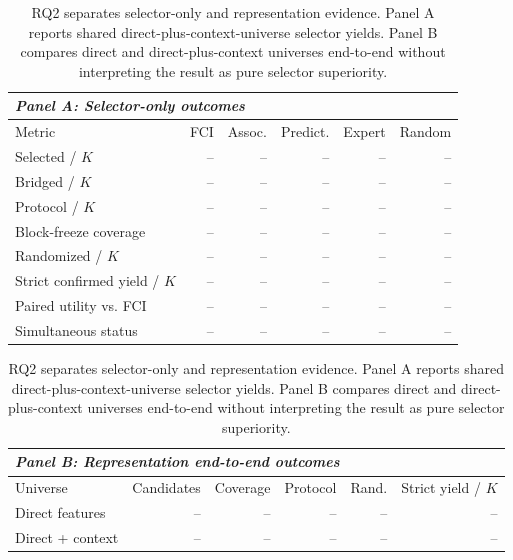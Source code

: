 \begin{table}[H]
  \centering
  \small
  \caption{RQ2 separates selector-only and representation evidence. Panel A
  reports shared direct-plus-context-universe selector yields. Panel B compares
  direct and direct-plus-context universes end-to-end without interpreting the
  result as pure selector superiority.}
  \label{tab:rq2}
  \begin{tabular}{lrrrrr}
    \toprule
    \multicolumn{6}{l}{\textit{Panel A: Selector-only outcomes}} \\
    \midrule
    Metric & FCI & Assoc. & Predict. & Expert & Random \\
    \midrule
    Selected / $K$ & -- & -- & -- & -- & -- \\
    Bridged / $K$ & -- & -- & -- & -- & -- \\
    Protocol / $K$ & -- & -- & -- & -- & -- \\
    Block-freeze coverage & -- & -- & -- & -- & -- \\
    Randomized / $K$ & -- & -- & -- & -- & -- \\
    Strict confirmed yield / $K$ & -- & -- & -- & -- & -- \\
    Paired utility vs. FCI & -- & -- & -- & -- & -- \\
    Simultaneous status & -- & -- & -- & -- & -- \\
    \bottomrule
  \end{tabular}

  \medskip
  \begin{tabular}{lrrrrr}
    \toprule
    \multicolumn{6}{l}{\textit{Panel B: Representation end-to-end outcomes}} \\
    \midrule
    Universe & Candidates & Coverage & Protocol & Rand. & Strict yield / $K$ \\
    \midrule
    Direct features & -- & -- & -- & -- & -- \\
    Direct + context & -- & -- & -- & -- & -- \\
    \bottomrule
  \end{tabular}
\end{table}


